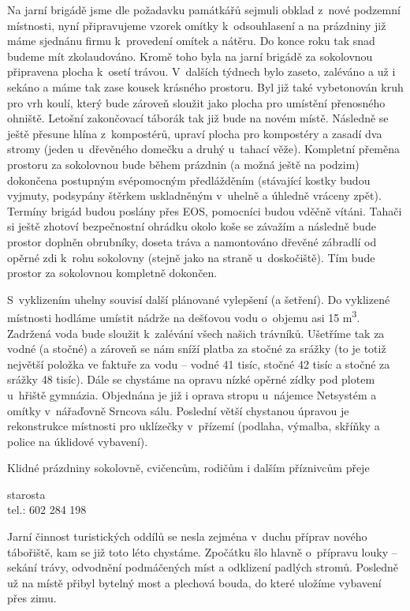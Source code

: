 \documentclass[11pt]{article}
\begin{document}
Na jarní brigádě jsme dle požadavku památkářů sejmuli obklad z~nové
podzemní
místnosti, nyní připravujeme vzorek omítky k~odsouhlasení a na prázdniny
již
máme sjednánu firmu k~provedení omítek a nátěru. Do konce roku tak snad
budeme mít zkolaudováno.
Kromě toho byla na jarní brigádě za sokolovnou připravena plocha k~osetí
trávou.
V~dalších týdnech bylo zaseto, zaléváno a už i sekáno a máme tak zase
kousek
krásného prostoru. Byl již také vybetonován kruh pro vrh koulí, který
bude zároveň
sloužit jako plocha pro umístění přenosného ohniště. Letošní zakončovací
táborák
tak již bude na novém místě. Následně se ještě přesune hlína
z~kompostérů, upraví
plocha pro kompostéry a zasadí dva stromy (jeden u~dřevěného domečku a
druhý
u~tahací věže). Kompletní přeměna prostoru za sokolovnou bude během
prázdnin (a
možná ještě na podzim) dokončena postupným svépomocným předlážděním
(stávající kostky budou vyjmuty, podsypány štěrkem uskladněným v~uhelně
a
úhledně vráceny zpět). Termíny brigád budou poslány přes EOS, pomocníci
budou vděčně vítáni. Tahači si ještě zhotoví bezpečnostní ohrádku okolo
koše se závažím a následně bude prostor doplněn obrubníky, doseta tráva
a namontováno dřevěné zábradlí od opěrné zdi k~rohu sokolovny (stejně
jako na straně u~doskočiště). Tím bude prostor za
sokolovnou kompletně dokončen.

S~vyklizením uhelny souvisí další plánované vylepšení (a šetření). Do
vyklizené
místnosti hodláme umístit nádrže na dešťovou vodu o~objemu asi 15
m\textsuperscript{3}. Zadržená
voda bude sloužit k~zalévání všech našich trávníků. Ušetříme tak za
vodné (a stočné)
a zároveň se nám sníží platba za stočné za srážky (to je totiž největší
položka ve
faktuře za vodu -- vodné 41 tisíc, stočné 42 tisíc a stočné za srážky 48
tisíc).
Dále se chystáme na opravu nízké opěrné zídky pod plotem u~hřiště
gymnázia.
Objednána je již i oprava stropu u~nájemce Netsystém a omítky
v~nářaďovně Srncova
sálu. Poslední větší chystanou úpravou je rekonstrukce místnosti pro
uklízečky
v~přízemí (podlaha, výmalba, skříňky a police na úklidové vybavení).

Klidné prázdniny sokolovně, cvičencům, rodičům i dalším příznivcům přeje

\signature{Jiří Novák (Jirkan)}{starosta\\tel.: 602 284 198}

Jarní činnost turistických oddílů se nesla zejména v~duchu příprav
nového tábořiště, kam se již toto léto chystáme. Zpočátku šlo hlavně
o~přípravu louky --⁠⁠⁠⁠⁠⁠ sekání trávy, odvodnění podmáčených míst a odklizení
padlých stromů. Posledně už na místě přibyl bytelný most a plechová
bouda, do které uložíme vybavení přes zimu.
\end{document}
